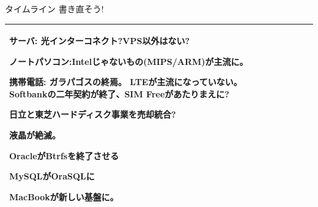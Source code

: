 \begin{frame}{タイムライン 書き直そう!}
{\begin{tabular}[t]{|p{8.5em}|p{12em}|p{8em}|p{6em}|p{8em}|}
サーバ:
光インターコネクト?VPS以外はない?

ノートパソコン:Intelじゃないもの(MIPS/ARM)が主流に。

携帯電話:
ガラパゴスの終焉。
LTEが主流になっていない。
Softbankの二年契約が終了、SIM Freeがあたりまえに?

日立と東芝ハードディスク事業を売却統合?

液晶が絶滅。

OracleがBtrfsを終了させる

MySQLがOraSQLに


MacBookが新しい基盤に。

\\

\hline
\end{tabular}

}
\end{frame}

